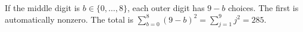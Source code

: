 If the middle digit is $b\in\{0,\ldots,8\}$, each outer digit has $9-b$ choices. The first is automatically nonzero. The total is $\sum_{b=0}^8(9-b)^2=\sum_{j=1}^9j^2=\boxed{285}$.
